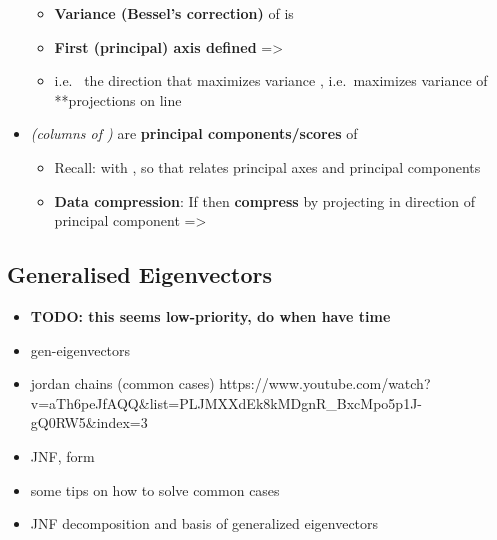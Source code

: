 \begin{itemize}
  \begin{itemize}
  
  \item
    \textbf{Variance (Bessel's correction)} of
     is
  \item
    \textbf{First (principal) axis defined} =\textgreater{}
  \item
    i.e.~ the direction that maximizes
    variance , i.e.~maximizes
    variance of **projections on line
  \end{itemize}
\item
  \emph{(columns of )} are \textbf{principal
  components/scores} of 

  \begin{itemize}
  
  \item
    Recall:
    with , so that
    relates principal axes and principal components
  \item
    \textbf{Data compression}: If 
    then \textbf{compress}  by projecting in direction of
    principal component =\textgreater{}
  \end{itemize}
\end{itemize}

\subsection*{Generalised Eigenvectors}

\begin{itemize}

\item
  \textbf{TODO: this seems low-priority, do when have time}
\item
  gen-eigenvectors
\item
  jordan chains (common cases)
  https://www.youtube.com/watch?v=aTh6peJfAQQ\&list=PLJMXXdEk8kMDgnR\_BxcMpo5p1J-gQ0RW5\&index=3
\item
  JNF, form
\item
  some tips on how to solve common cases
\item
  JNF decomposition and basis of generalized eigenvectors
\end{itemize}

